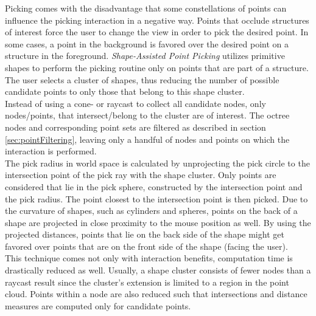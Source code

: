 Picking comes with the disadvantage that some constellations of points can influence the picking interaction in a negative way. Points that occlude structures of interest force the user to change the view in order to pick the desired point. In some cases, a point in the background is favored over the desired point on a structure in the foreground. \textit{Shape-Assisted Point Picking} utilizes primitive shapes to perform the picking routine only on points that are part of a structure. The user selects a cluster of shapes, thus reducing the number of possible candidate points to only those that belong to this shape cluster. 
\\ 
Instead of using a cone- or raycast to collect all candidate nodes, only nodes/points, that intersect/belong to the cluster are of interest. The octree nodes and corresponding point sets are filtered as described in section \ref{sec:pointFiltering}, leaving only a handful of nodes and points on which the interaction is performed. 
\\
The pick radius in world space is calculated by unprojecting the pick circle to the intersection point of the pick ray with the shape cluster. Only points are considered that lie in the pick sphere, constructed by the intersection point and the pick radius. The point closest to the intersection point is then picked. Due to the curvature of shapes, such as cylinders and spheres, points on the back of a shape are projected in close proximity to the mouse position as well. By using the projected distances, points that lie on the back side of the shape might get favored over points that are on the front side of the shape (facing the user). 
\\
This technique comes not only with interaction benefits, computation time is drastically reduced as well. Usually, a shape cluster consists of fewer nodes than a raycast result since the cluster's extension is limited to a region in the point cloud. Points within a node are also reduced such that intersections and distance measures are computed only for candidate points. 
\\
